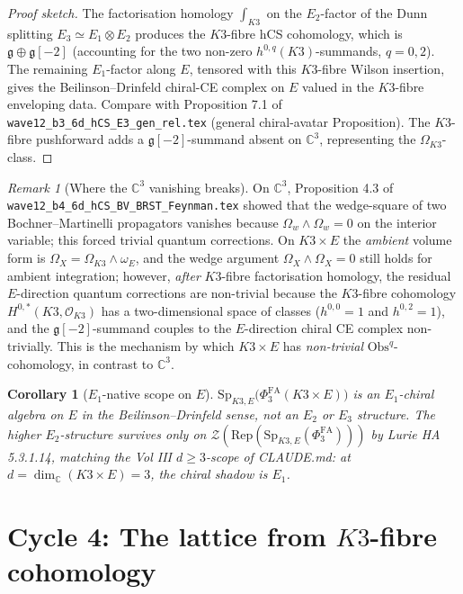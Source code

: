 \documentclass[11pt]{amsart}
\providecommand{\C}{\mathbb{C}}
\providecommand{\cO}{\mathcal{O}}
\providecommand{\cZ}{\mathcal{Z}}
\providecommand{\g}{\mathfrak{g}}
\providecommand{\Obs}{\mathrm{Obs}}
\providecommand{\Eone}{E_{1}}
\providecommand{\Etwo}{E_{2}}
\providecommand{\Ethree}{E_{3}}
\providecommand{\PhiFA}{\Phi^{\mathrm{FA}}}
\providecommand{\SpF}{\mathrm{Sp}}
\theoremstyle{plain}
\newtheorem{corollary}[theorem]{Corollary}
\theoremstyle{definition}
\theoremstyle{remark}
\newtheorem{remark}[theorem]{Remark}
\begin{document}
\begin{proof}[Proof sketch]
The factorisation homology $\int_{K3}$ on the $\Etwo$-factor of the
Dunn splitting $E_{3}\simeq\Eone\otimes\Etwo$ produces the $K3$-fibre
hCS cohomology, which is $\g\oplus \g[-2]$ (accounting for the two
non-zero $h^{0,q}(K3)$-summands, $q=0,2$). The remaining $\Eone$-factor
along $E$, tensored with this $K3$-fibre Wilson insertion, gives the
Beilinson--Drinfeld chiral-CE complex on $E$ valued in the
$K3$-fibre enveloping data. Compare with Proposition 7.1 of
\texttt{wave12\_b3\_6d\_hCS\_E3\_gen\_rel.tex}
(general chiral-avatar Proposition). The $K3$-fibre pushforward adds a
$\g[-2]$-summand absent on $\C^{3}$, representing the
$\Omega_{K3}$-class.
\end{proof}

\begin{remark}[Where the $\C^{3}$ vanishing breaks]\label{rem:vanishing-breaks}
On $\C^{3}$, Proposition 4.3 of
\texttt{wave12\_b4\_6d\_hCS\_BV\_BRST\_Feynman.tex}
showed that the wedge-square of two Bochner--Martinelli propagators
vanishes because $\Omega_{w}\wedge \Omega_{w} = 0$ on the interior
variable; this forced trivial quantum corrections. On $K3\times E$ the
\emph{ambient} volume form is
$\Omega_{X} = \Omega_{K3}\wedge\omega_{E}$, and the wedge argument
$\Omega_{X}\wedge \Omega_{X} = 0$ still holds for ambient integration;
however, \emph{after} $K3$-fibre factorisation homology, the residual
$E$-direction quantum corrections are non-trivial because the
$K3$-fibre cohomology $H^{0,\ast}(K3,\cO_{K3})$ has a two-dimensional
space of classes ($h^{0,0}=1$ and $h^{0,2}=1$), and the $\g[-2]$-summand
couples to the $E$-direction chiral CE complex non-trivially. This is the
mechanism by which $K3\times E$ has \emph{non-trivial}
$\Obs^{q}$-cohomology, in contrast to $\C^{3}$.
\end{remark}

\begin{corollary}[$\Eone$-native scope on $E$]\label{cor:E1-on-E}
$\SpF_{K3,E}\bigl(\PhiFA_{3}(K3\times E)\bigr)$ is an $\Eone$-chiral
algebra on $E$ in the Beilinson--Drinfeld sense, not an $\Etwo$ or
$\Ethree$ structure. The higher $\Etwo$-structure survives only on
$\cZ(\mathrm{Rep}(\SpF_{K3,E}(\PhiFA_{3})))$ by Lurie HA 5.3.1.14,
matching the Vol III $d\geq 3$-scope of CLAUDE.md: at $d = \dim_{\C}
(K3\times E) = 3$, the chiral shadow is $\Eone$.
\end{corollary}

\section{Cycle 4: The lattice from $K3$-fibre cohomology}
\end{document}

